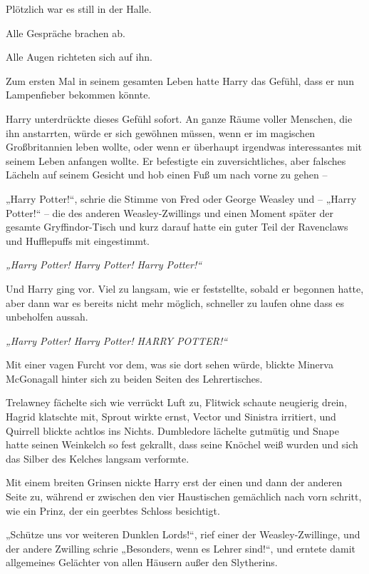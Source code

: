 Plötzlich war es still in der Halle.

Alle Gespräche brachen ab.

Alle Augen richteten sich auf ihn.

Zum ersten Mal in seinem gesamten Leben hatte Harry das Gefühl, dass er nun Lampenfieber bekommen könnte.

Harry unterdrückte dieses Gefühl sofort. An ganze Räume voller Menschen, die ihn anstarrten, würde er sich gewöhnen müssen, wenn er im magischen Großbritannien leben wollte, oder wenn er überhaupt irgendwas interessantes mit seinem Leben anfangen wollte. Er befestigte ein zuversichtliches, aber falsches Lächeln auf seinem Gesicht und hob einen Fuß um nach vorne zu gehen –

„Harry Potter!“, schrie die Stimme von Fred oder George Weasley und – „Harry Potter!“ – die des anderen Weasley-Zwillings und einen Moment später der gesamte Gryffindor-Tisch und kurz darauf hatte ein guter Teil der Ravenclaws und Hufflepuffs mit eingestimmt.

\emph{„Harry Potter! Harry Potter! Harry Potter!“}

Und Harry ging vor. Viel zu langsam, wie er feststellte, sobald er begonnen hatte, aber dann war es bereits nicht mehr möglich, schneller zu laufen ohne dass es unbeholfen aussah.

\later

\emph{„Harry Potter! Harry Potter! HARRY POTTER!“}

Mit einer vagen Furcht vor dem, was sie dort sehen würde, blickte Minerva McGonagall hinter sich zu beiden Seiten des Lehrertisches.

Trelawney fächelte sich wie verrückt Luft zu, Flitwick schaute neugierig drein, Hagrid klatschte mit, Sprout wirkte ernst, Vector und Sinistra irritiert, und Quirrell blickte achtlos ins Nichts. Dumbledore lächelte gutmütig und Snape hatte seinen Weinkelch so fest gekrallt, dass seine Knöchel weiß wurden und sich das Silber des Kelches langsam verformte.

Mit einem breiten Grinsen nickte Harry erst der einen und dann der anderen Seite zu, während er zwischen den vier Haustischen gemächlich nach vorn schritt, wie ein Prinz, der ein geerbtes Schloss besichtigt.

„Schütze uns vor weiteren Dunklen Lords!“, rief einer der Weasley-Zwillinge, und der andere Zwilling schrie „Besonders, wenn es Lehrer sind!“, und erntete damit allgemeines Gelächter von allen Häusern außer den Slytherins.

